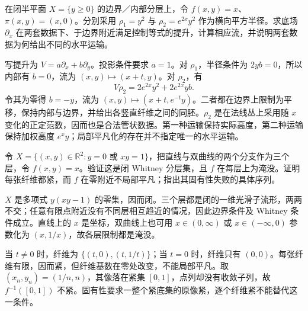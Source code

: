 \begin{exercise}\label{g2:ex:control-radius-choice}
	在闭半平面 \(X=\{y\ge0\}\) 的边界／内部分层上，令 \(f(x,y)=x\)、\(\pi(x,y)=(x,0)\)。分别采用 \(\rho_1=y^2\) 与 \(\rho_2=e^{2x}y^2\) 作为横向平方半径。求底场 \(\partial_x\) 在两套数据下、于边界附近满足控制等式的提升，计算相应流，并说明两套数据为何给出不同的水平运输。
\end{exercise}
\begin{solution}
	写提升为 \(V=a\partial_x+b\partial_y\)。投影条件要求 \(a=1\)。对 \(\rho_1\)，半径条件为 \(2yb=0\)，所以内部有 \(b=0\)，流为 \((x,y)\mapsto(x+t,y)\)。对 \(\rho_2\)，有
	\[
		V\rho_2=2e^{2x}y^2+2e^{2x}yb.
	\]
	令其为零得 \(b=-y\)，流为 \((x,y)\mapsto(x+t,e^{-t}y)\)。二者都在边界上限制为平移，保持内部与边界，并给出各竖直纤维之间的同胚。\(\rho_2\) 是在法线丛上采用随 \(x\) 变化的正定范数，因而也是合法管状数据。第一种运输保持实际高度，第二种运输保持加权高度 \(e^xy\)；局部平凡化的存在并不指定唯一的水平运输。
\end{solution}

\begin{exercise}\label{g2:ex:stratified-compact-fibers-not-proper}
	令 \(X=\{(x,y)\in\mathbb R^2:y=0\text{ 或 }xy=1\}\)，把直线与双曲线的两个分支作为三个层，令 \(f(x,y)=x\)。验证这是闭 Whitney 分层集，且 \(f\) 在每层上为淹没。证明每张纤维都紧，而 \(f\) 在零附近不局部平凡；指出其固有性失败的具体序列。
\end{exercise}
\begin{solution}
	\(X\) 是多项式 \(y(xy-1)\) 的零集，因而闭。三个层都是闭的一维光滑子流形，两两不交；任意有限点附近没有不同层相互趋近的情况，因此边界条件及 Whitney 条件成立。直线上的 \(x\) 是坐标，双曲线上也可用 \(x\in(0,\infty)\) 或 \(x\in(-\infty,0)\) 参数化为 \((x,1/x)\)，故各层限制都是淹没。

	当 \(t\ne0\) 时，纤维为 \(\{(t,0),(t,1/t)\}\)；当 \(t=0\) 时，纤维只有 \((0,0)\)。每张纤维有限，因而紧，但纤维基数在零处改变，不能局部平凡。取 \((x_n,y_n)=(1/n,n)\)，其像落在紧集 \([0,1]\)，点列却没有收敛子列，故 \(f^{-1}([0,1])\) 不紧。固有性要求一整个紧底集的原像紧，逐个纤维紧不能替代这一条件。
\end{solution}

